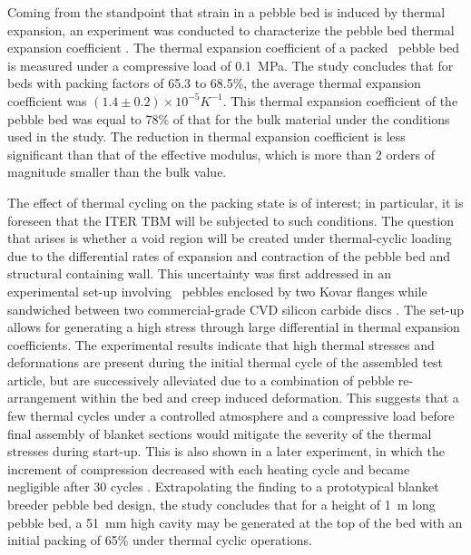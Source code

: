 Coming from the standpoint that strain in a pebble bed is induced by thermal expansion, an experiment was conducted to characterize the pebble bed thermal expansion coefficient \cite{Tanigawa:2007fc}.  The thermal expansion coefficient of a packed \lit~pebble bed is measured under a compressive load of \SI{0.1}{\mega\pascal}.  The study concludes that for beds with packing factors of 65.3 to 68.5\%, the average thermal expansion coefficient was $(1.4\pm0.2)\times10^{-5}K^{-1}$. This thermal expansion coefficient of the pebble bed was equal to 78\% of that for the bulk material under the conditions used in the study. The reduction in thermal expansion coefficient is less significant than that of the effective modulus, which is more than 2 orders of magnitude smaller than the bulk value. 


The effect of thermal cycling on the packing state is of interest; in particular, it is foreseen that the ITER TBM will be subjected to such conditions. The question that arises is whether a void region will be created under thermal-cyclic loading due to the differential rates of expansion and contraction of the pebble bed and structural containing wall. This uncertainty was first addressed in an experimental set-up involving \lit~pebbles enclosed by two Kovar flanges while sandwiched between two commercial-grade CVD silicon carbide discs \cite{Calderoni:2006ye}. The set-up allows for generating a high stress through large differential in thermal expansion coefficients. The experimental results indicate that high thermal stresses and deformations are present during the initial thermal cycle of the assembled test article, but are successively alleviated due to a combination of pebble re-arrangement within the bed and creep induced deformation. This suggests that a few thermal cycles under a controlled atmosphere and a compressive load before final assembly of blanket sections would mitigate the severity of the thermal stresses during start-up. This is also shown in a later experiment, in which the increment of compression decreased with each heating cycle and became negligible after 30 cycles \cite{Tanigawa:2010cr}. Extrapolating the finding to a prototypical blanket breeder pebble bed design, the study concludes that for a height of \SI{1}{\meter} long pebble bed, a \SI{51}{\milli\meter} high cavity may be generated at the top of the bed with an initial packing of 65\% under thermal cyclic operations.  





